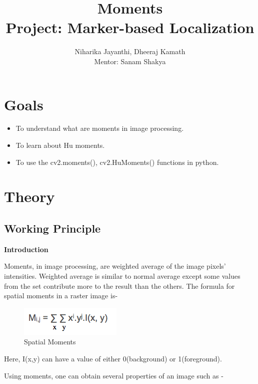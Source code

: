 \documentclass[]{article}
\date{}
\providecommand{\tightlist}{%
  \setlength{\itemsep}{0pt}\setlength{\parskip}{0pt}}
\begin{document}
	\title{\huge\textbf{Moments}\LARGE \\Project: Marker-based Localization}
	\author{Niharika Jayanthi, Dheeraj Kamath \\Mentor: Sanam Shakya}
	\maketitle
	\pagebreak
\section{Goals}\label{goals}

\begin{itemize}
\tightlist
\item
  To understand what are moments in image processing.
\item
  To learn about Hu moments.
\item
  To use the cv2.moments(), cv2.HuMoments() functions in python.
\end{itemize}

\section{Theory}\label{theory}

\subsection{Working Principle}\label{working-principle}

\textbf{Introduction}

Moments, in image processing, are weighted average of the image pixels'
intensities. Weighted average is similar to normal average except some
values from the set contribute more to the result than the others. The
formula for spatial moments in a raster image is-

\begin{figure}[htbp]
\centering
\includegraphics{images/Moments/Spatial moments.png}
\caption{Spatial Moments}
\end{figure}

Here, I(x,y) can have a value of either 0(background) or 1(foreground).

Using moments, one can obtain several properties of an image such as -
\end{document}
